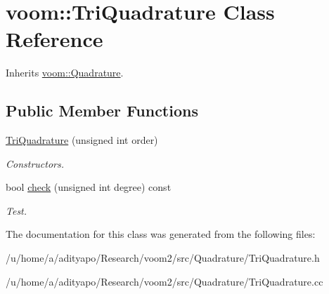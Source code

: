 \hypertarget{classvoom_1_1_tri_quadrature}{
\section{voom::TriQuadrature Class Reference}
\label{classvoom_1_1_tri_quadrature}
}


Inherits \hyperlink{classvoom_1_1_quadrature}{voom::Quadrature}.\subsection*{Public Member Functions}
\begin{DoxyCompactItemize}
\item 
\hypertarget{classvoom_1_1_tri_quadrature_a28624f45052474c3577c4cad71b053a2}{
\hyperlink{classvoom_1_1_tri_quadrature_a28624f45052474c3577c4cad71b053a2}{TriQuadrature} (unsigned int order)}
\label{classvoom_1_1_tri_quadrature_a28624f45052474c3577c4cad71b053a2}

\begin{DoxyCompactList}\small\item\em Constructors. \item\end{DoxyCompactList}\item 
\hypertarget{classvoom_1_1_tri_quadrature_ab3de8be8921558eed98c4c9814fea985}{
bool \hyperlink{classvoom_1_1_tri_quadrature_ab3de8be8921558eed98c4c9814fea985}{check} (unsigned int degree) const }
\label{classvoom_1_1_tri_quadrature_ab3de8be8921558eed98c4c9814fea985}

\begin{DoxyCompactList}\small\item\em Test. \item\end{DoxyCompactList}\end{DoxyCompactItemize}


The documentation for this class was generated from the following files:\begin{DoxyCompactItemize}
\item 
/u/home/a/adityapo/Research/voom2/src/Quadrature/TriQuadrature.h\item 
/u/home/a/adityapo/Research/voom2/src/Quadrature/TriQuadrature.cc\end{DoxyCompactItemize}
